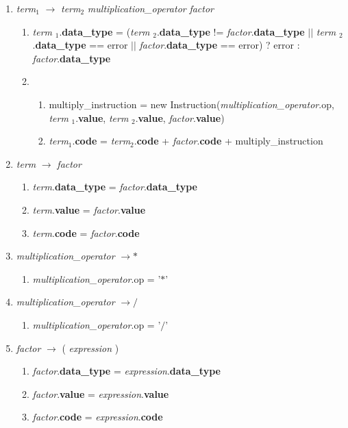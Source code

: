 \documentclass[12pt]{article}
\newcommand{\sub}[1]{$_{#1}$}
\begin{document}
\begin{enumerate}[label = \arabic*.]
\item \textit{term\sub{1}} $\rightarrow$ \textit{term\sub{2}} \textit{multiplication\_operator} \textit{factor}
\begin{enumerate}[label = \roman*.]
\item \textit{term} \sub{1}.\textbf{data\_type} = (\textit{term} \sub{2}.\textbf{data\_type} != \textit{factor}.\textbf{data\_type} $||$ \textit{term} \sub{2}.\textbf{data\_type} == error $||$ \textit{factor}.\textbf{data\_type} == error) ? error : \textit{factor}.\textbf{data\_type}
\item
\begin{enumerate}[label = \alph*.]
\item multiply\_instruction = new Instruction(\textit{multiplication\_operator}.op, \textit{term} \sub{1}.\textbf{value}, \textit{term} \sub{2}.\textbf{value}, \textit{factor}.\textbf{value})
\item \textit{term}\sub{1}.\textbf{code} = \textit{term}\sub{2}.\textbf{code} + \textit{factor}.\textbf{code} + multiply\_instruction
\end{enumerate}
\end{enumerate}

\item \textit{ term } $\rightarrow$ \textit{ factor }
\begin{enumerate}[label = \roman*.]
\item \textit{term}.\textbf{data\_type} = \textit{factor}.\textbf{data\_type}
\item \textit{term}.\textbf{value} = \textit{factor}.\textbf{value}
\item \textit{term}.\textbf{code} = \textit{factor}.\textbf{code}
\end{enumerate}

\item \textit{ multiplication\_operator } $\rightarrow *$
\begin{enumerate}[label = \roman*.]
\item \textit{multiplication\_operator}.op = '$*$'
\end{enumerate}

\item \textit{ multiplication\_operator } $\rightarrow /$
\begin{enumerate}[label = \roman*.]
\item \textit{multiplication\_operator}.op = '$/$'
\end{enumerate}

\item \textit{ factor } $\rightarrow$ (\textit{ expression} )
\begin{enumerate}[label = \roman*.]
\item \textit{factor}.\textbf{data\_type} = \textit{expression}.\textbf{data\_type}
\item \textit{factor}.\textbf{value} = \textit{expression}.\textbf{value}
\item \textit{factor}.\textbf{code} = \textit{expression}.\textbf{code}
\end{enumerate}


\end{enumerate}
\end{document}
